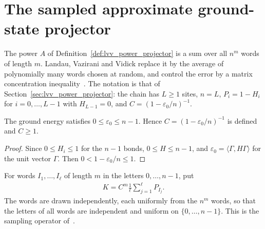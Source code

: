 \section{The sampled approximate ground-state projector}
\label{sec:lvv_sampled_projector}

The power $A$ of Definition~\ref{def:lvv_power_projector} is a sum over all
$n^m$ words of length $m$. Landau, Vazirani and Vidick replace it by the average
of polynomially many words chosen at random, and control the error by a matrix
concentration inequality~\cite[lines 606--649]{Landau2015Polynomial}. The
notation is that of Section~\ref{sec:lvv_power_projector}: the chain has $L\ge1$
sites, $n=L$, $P_i=1-H_i$ for $i=0,\ldots,L-1$ with $H_{L-1}=0$, and
$C=(1-\varepsilon_0/n)^{-1}$.

\begin{lemma}
    \label{lem:lvv_ground_energy_range}
    \leanok
    The ground energy satisfies $0\le\varepsilon_0\le n-1$. Hence
    $C=(1-\varepsilon_0/n)^{-1}$ is defined and $C\ge1$.
\end{lemma}

\begin{proof}
    \leanok
    Since $0\le H_i\le1$ for the $n-1$ bonds, $0\le H\le n-1$, and
    $\varepsilon_0=\langle\Gamma,H\Gamma\rangle$ for the unit vector $\Gamma$.
    Then $0<1-\varepsilon_0/n\le1$.
\end{proof}

\begin{definition}
    \label{def:lvv_sampled_projector}
    \leanok
    For words $I_1,\ldots,I_\ell$ of length $m$ in the letters
    $0,\ldots,n-1$, put
    \begin{align}
        K=C^m\frac1\ell\sum_{j=1}^\ell P_{I_j}.
        \label{eq:lvv_sampled_projector}
    \end{align}
    The words are drawn independently, each uniformly from the $n^m$ words, so
    that the letters of all words are independent and uniform on
    $\{0,\ldots,n-1\}$. This is the sampling operator
    of~\cite[line 611]{Landau2015Polynomial}.
\end{definition}

